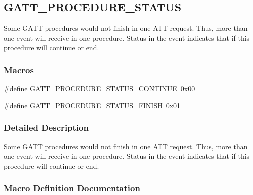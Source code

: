 \hypertarget{group___g_a_t_t___p_r_o_c_e_d_u_r_e___s_t_a_t_u_s}{}\subsection{G\+A\+T\+T\+\_\+\+P\+R\+O\+C\+E\+D\+U\+R\+E\+\_\+\+S\+T\+A\+T\+US}
\label{group___g_a_t_t___p_r_o_c_e_d_u_r_e___s_t_a_t_u_s}


Some G\+A\+TT procedures would not finish in one A\+TT request. Thus, more than one event will receive in one procedure. Status in the event indicates that if this procedure will continue or end.  


\subsubsection*{Macros}
\begin{DoxyCompactItemize}
\item 
\#define \hyperlink{group___g_a_t_t___p_r_o_c_e_d_u_r_e___s_t_a_t_u_s_gab2d7dd946dd141184b8b69e56e726b5f}{G\+A\+T\+T\+\_\+\+P\+R\+O\+C\+E\+D\+U\+R\+E\+\_\+\+S\+T\+A\+T\+U\+S\+\_\+\+C\+O\+N\+T\+I\+N\+UE}~0x00
\item 
\#define \hyperlink{group___g_a_t_t___p_r_o_c_e_d_u_r_e___s_t_a_t_u_s_ga961d70e792ee8ea205c2fb6c83a5a420}{G\+A\+T\+T\+\_\+\+P\+R\+O\+C\+E\+D\+U\+R\+E\+\_\+\+S\+T\+A\+T\+U\+S\+\_\+\+F\+I\+N\+I\+SH}~0x01
\end{DoxyCompactItemize}


\subsubsection{Detailed Description}
Some G\+A\+TT procedures would not finish in one A\+TT request. Thus, more than one event will receive in one procedure. Status in the event indicates that if this procedure will continue or end. 



\subsubsection{Macro Definition Documentation}
